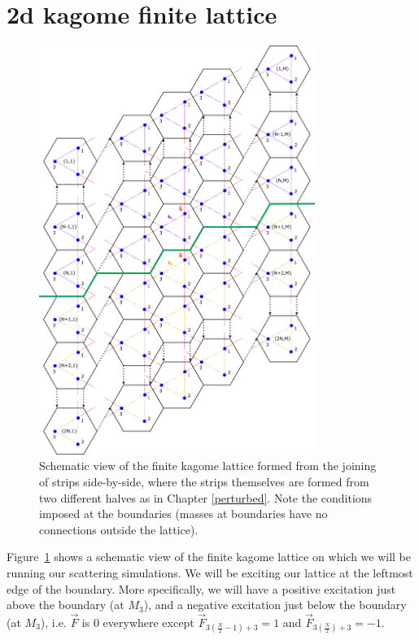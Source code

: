 \section{2d kagome finite lattice}
\begin{figure}[!h]
\centering
\includegraphics[width=0.8\textwidth]{imgs/kagomefinitemodel.png}
\caption{\label{fig:kagomefinscheme} Schematic view of the finite kagome
  lattice formed from the joining of strips side-by-side, where the strips
  themselves are formed from two different halves as in Chapter
  \ref{perturbed}. Note the conditions imposed at the boundaries (masses at
  boundaries have no connections outside the lattice).}
\end{figure}

Figure~\ref{fig:kagomefinscheme} shows a schematic view of the finite kagome
lattice on which we will be running our scattering simulations. We will be
exciting our lattice at the leftmost edge of the boundary. More specifically,
we will have a positive excitation just above the boundary (at $M_3$), and a
negative excitation just below the boundary (at $M_3$), i.e. $\vec{F}$ is $0$
everywhere except $\vec{F}_{3(\frac{N}{2}-1)+3}=1$ and
$\vec{F}_{3(\frac{N}{2})+3}=-1$.


